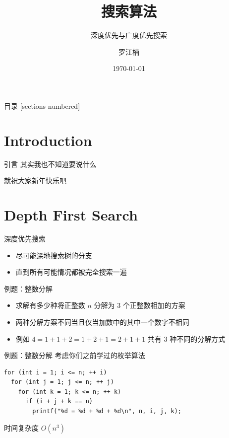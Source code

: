 \documentclass[12pt,aspectratio=169]{beamer}
\title{搜索算法}
\subtitle{深度优先与广度优先搜索}
\date{\today}
\author{罗江楠}
\institute{哈尔滨工业大学（威海）}
\begin{document}
\maketitle

\begin{frame}{目录}
  [sections numbered]
  \tableofcontents[hideallsubsections]
\end{frame}

\section[引言]{Introduction}

\begin{frame}[fragile]{引言}
  其实我也不知道要说什么\pause

  就祝大家新年快乐吧
\end{frame}

\section[深度优先搜索]{Depth First Search}

\begin{frame}[fragile]{深度优先搜索}
  \begin{itemize}
    \item 尽可能深地搜索树的分支
    \item 直到所有可能情况都被完全搜索一遍
  \end{itemize}
\end{frame}

\begin{frame}[fragile]{例题：整数分解}
  \begin{itemize}
    \item 求解有多少种将正整数 $n$ 分解为 $3$ 个正整数相加的方案
    \item 两种分解方案不同当且仅当加数中的其中一个数字不相同
    \item 例如 $4=1+1+2=1+2+1=2+1+1$ 共有 $3$ 种不同的分解方式
  \end{itemize}
\end{frame}

\begin{frame}[fragile]{例题：整数分解}
  考虑你们之前学过的枚举算法
  \begin{verbatim}
for (int i = 1; i <= n; ++ i)
  for (int j = 1; j <= n; ++ j)
    for (int k = 1; k <= n; ++ k)
      if (i + j + k == n)
        printf("%d = %d + %d + %d\n", n, i, j, k);
  \end{verbatim}\pause
  时间复杂度 $O(n^3)$
\end{frame}
\end{document}
